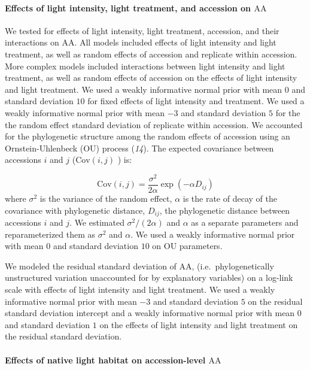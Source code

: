 \documentclass[
  letterpaper,
  DIV=11,
  numbers=noendperiod]{scrartcl}
\let\oldparagraph\paragraph
\renewcommand{\paragraph}[1]{\oldparagraph{#1}\mbox{}}
\newcommand{\aax}{$\mathrm{AA}$}
\begin{document}
\paragraph{\texorpdfstring{Effects of light intensity, light treatment,
and accession on
\aax}{Effects of light intensity, light treatment, and accession on }}\label{effects-of-light-intensity-light-treatment-and-accession-on}

We tested for effects of light intensity, light treatment, accession,
and their interactions on \aax. All models included effects of light
intensity and light treatment, as well as random effects of accession
and replicate within accession. More complex models included
interactions between light intensity and light treatment, as well as
random effects of accession on the effects of light intensity and light
treatment. We used a weakly informative normal prior with mean \(0\) and
standard deviation \(10\) for fixed effects of light intensity and
treatment. We used a weakly informative normal prior with mean \(-3\)
and standard deviation \(5\) for the the random effect standard
deviation of replicate within accession. We accounted for the
phylogenetic structure among the random effects of accession using an
Ornstein-Uhlenbeck (OU) process (\emph{14}). The expected covariance
between accessions \(i\) and \(j\) (\(\text{Cov}(i, j)\) ) is:

\[\text{Cov}(i, j) = \frac{\sigma^2}{2 \alpha} \exp(-\alpha D_{ij})\]
where \(\sigma^2\) is the variance of the random effect, \(\alpha\) is
the rate of decay of the covariance with phylogenetic distance,
\(D_{ij}\), the phylogenetic distance between accessions \(i\) and
\(j\). We estimated \(\sigma^2 / (2 \alpha)\) and \(\alpha\) as a
separate parameters and reparameterized them as \(\sigma^2\) and
\(\alpha\). We used a weakly informative normal prior with mean \(0\)
and standard deviation \(10\) on OU parameters.

We modeled the residual standard deviation of \aax,
(i.e.~phylogenetically unstructured variation unaccounted for by
explanatory variables) on a log-link scale with effects of light
intensity and light treatment. We used a weakly informative normal prior
with mean \(-3\) and standard deviation \(5\) on the residual standard
deviation intercept and a weakly informative normal prior with mean
\(0\) and standard deviation \(1\) on the effects of light intensity and
light treatment on the residual standard deviation.

\paragraph{\texorpdfstring{Effects of native light habitat on
accession-level
\aax}{Effects of native light habitat on accession-level }}\label{effects-of-native-light-habitat-on-accession-level}
\end{document}
